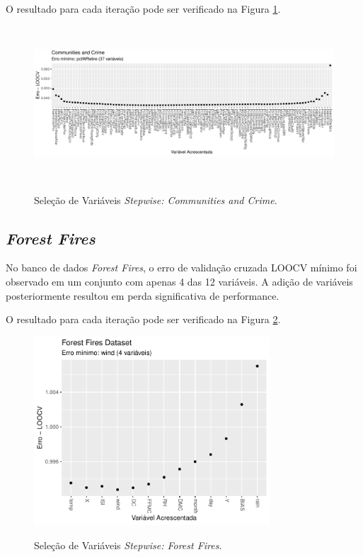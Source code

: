 O resultado para cada iteração pode ser verificado na Figura \ref{fig:stepwise_CommunitiesandCrime_validation}.

\begin{figure}[!htb]
    \centering
    \caption{Seleção de Variáveis \textit{Stepwise: Communities and Crime}.}
    \includegraphics[height=163pt]{imgs/res/CommunitiesandCrime_validation.pdf}
    \label{fig:stepwise_CommunitiesandCrime_validation}
\end{figure}
\FloatBarrier

\subsection{\textit{Forest Fires}}
No banco de dados \textit{Forest Fires}, o erro de validação cruzada LOOCV mínimo foi observado em um conjunto com apenas 4 das 12 variáveis. A adição de variáveis posteriormente resultou em perda significativa de performance. 

O resultado para cada iteração pode ser verificado na Figura \ref{fig:stepwise_ForestFiresDataset_validation}.

\begin{figure}[!htb]
    \centering
    \caption{Seleção de Variáveis \textit{Stepwise: Forest Fires}.}
    \includegraphics[height=200pt]{imgs/res/ForestFiresDataset_validation.pdf}
    \label{fig:stepwise_ForestFiresDataset_validation}
\end{figure}
\FloatBarrier

